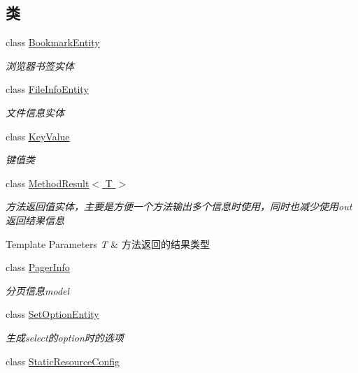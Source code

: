 \subsection*{类}
\begin{DoxyCompactItemize}
\item 
class \hyperlink{class_x_c_l_net_tools_1_1_entity_1_1_bookmark_entity}{Bookmark\-Entity}
\begin{DoxyCompactList}\small\item\em 浏览器书签实体 \end{DoxyCompactList}\item 
class \hyperlink{class_x_c_l_net_tools_1_1_entity_1_1_file_info_entity}{File\-Info\-Entity}
\begin{DoxyCompactList}\small\item\em 文件信息实体 \end{DoxyCompactList}\item 
class \hyperlink{class_x_c_l_net_tools_1_1_entity_1_1_key_value}{Key\-Value}
\begin{DoxyCompactList}\small\item\em 键值类 \end{DoxyCompactList}\item 
class \hyperlink{class_x_c_l_net_tools_1_1_entity_1_1_method_result_3_01_t_01_4}{Method\-Result$<$ T $>$}
\begin{DoxyCompactList}\small\item\em 方法返回值实体，主要是方便一个方法输出多个信息时使用，同时也减少使用out返回结果信息 
\begin{DoxyTemplParams}{Template Parameters}
{\em T} & 方法返回的结果类型\\
\hline
\end{DoxyTemplParams}
\end{DoxyCompactList}\item 
class \hyperlink{class_x_c_l_net_tools_1_1_entity_1_1_pager_info}{Pager\-Info}
\begin{DoxyCompactList}\small\item\em 分页信息model \end{DoxyCompactList}\item 
class \hyperlink{class_x_c_l_net_tools_1_1_entity_1_1_set_option_entity}{Set\-Option\-Entity}
\begin{DoxyCompactList}\small\item\em 生成select的option时的选项 \end{DoxyCompactList}\item 
class \hyperlink{class_x_c_l_net_tools_1_1_entity_1_1_static_resource_config}{Static\-Resource\-Config}

\end{DoxyCompactItemize}

